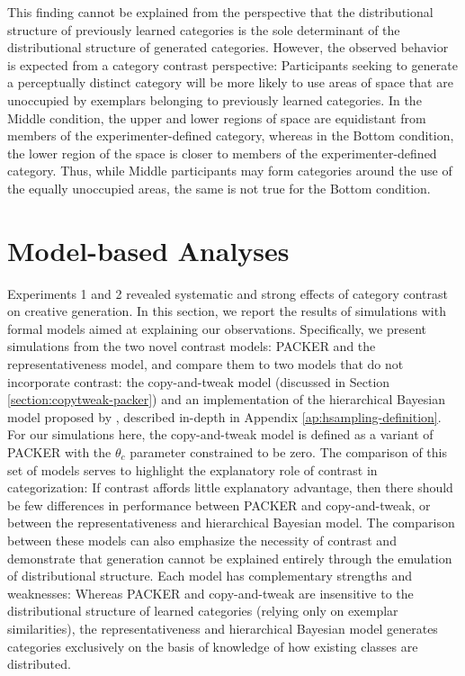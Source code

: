 \documentclass[12pt]{article}
\begin{document}
\begin{flushleft}
This finding cannot be explained from the perspective that the distributional
structure of previously learned categories is the sole determinant of the
distributional structure of generated categories. However, the observed behavior
is expected from a category contrast perspective: Participants seeking to
generate a perceptually distinct category will be more likely to use areas of
space that are unoccupied by exemplars belonging to previously learned
categories. In the Middle condition, the upper and lower regions of space are
equidistant from members of the experimenter-defined category, whereas in the
Bottom condition, the lower region of the space is closer to members of the
experimenter-defined category. Thus, while Middle participants may form
categories around the use of the equally unoccupied areas, the same is not true
for the Bottom condition.

\section{Model-based Analyses}
Experiments 1 and 2 revealed systematic and strong effects of category contrast
on creative generation. In this section, we report the results of simulations
with formal models aimed at explaining our observations. Specifically, we
present simulations from the two novel contrast models: PACKER and the
representativeness model, and compare them to two models that do not incorporate
contrast: the copy-and-tweak model (discussed in Section
\ref{section:copytweak-packer}) and an implementation of the hierarchical
Bayesian model proposed by \cite{jern2013probabilistic}, described in-depth in
Appendix \ref{ap:hsampling-definition}. For our simulations here, the
copy-and-tweak model is defined as a variant of PACKER with the $\theta_c$
parameter constrained to be zero. The comparison of this set of models serves to
highlight the explanatory role of contrast in categorization: If contrast
affords little explanatory advantage, then there should be few differences in
performance between PACKER and copy-and-tweak, or between the representativeness
and hierarchical Bayesian model. The comparison between these models can also
emphasize the necessity of contrast and demonstrate that generation cannot be
explained entirely through the emulation of distributional structure. Each model
has complementary strengths and weaknesses: Whereas PACKER and copy-and-tweak
are insensitive to the distributional structure of learned categories (relying
only on exemplar similarities), the representativeness and hierarchical Bayesian
model generates categories exclusively on the basis of knowledge of how existing
classes are distributed.


\end{flushleft}
\end{document}
